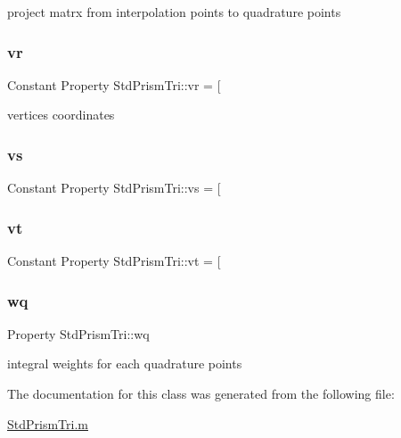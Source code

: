 project matrx from interpolation points to quadrature points 

\mbox{\label{class_std_prism_tri_a87d7bf3e382d8683bb7a75b79acc9d4b}} 
\subsubsection{\texorpdfstring{vr}{vr}}
{\footnotesize\ttfamily Constant Property Std\+Prism\+Tri\+::vr = \mbox{[}}



vertices coordinates 

\mbox{\label{class_std_prism_tri_aa4659d9663148da529fc50b5058c03f1}} 
\subsubsection{\texorpdfstring{vs}{vs}}
{\footnotesize\ttfamily Constant Property Std\+Prism\+Tri\+::vs = \mbox{[}}

\mbox{\label{class_std_prism_tri_a505548c307095d9254e96b82400346b8}} 
\subsubsection{\texorpdfstring{vt}{vt}}
{\footnotesize\ttfamily Constant Property Std\+Prism\+Tri\+::vt = \mbox{[}}

\mbox{\label{class_std_prism_tri_ae765bd6d352ea95b5102310916a8978a}} 
\subsubsection{\texorpdfstring{wq}{wq}}
{\footnotesize\ttfamily Property Std\+Prism\+Tri\+::wq\hspace{0.3cm}{\ttfamily [protected]}}



integral weights for each quadrature points 



The documentation for this class was generated from the following file\+:\begin{DoxyCompactItemize}
\item 
\hyperlink{_std_prism_tri_8m}{Std\+Prism\+Tri.\+m}\end{DoxyCompactItemize}
